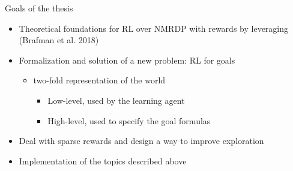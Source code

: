 \documentclass{beamer}
\begin{document}
\begin{frame}{Goals of the thesis}

\begin{itemize}
\item Theoretical foundations for RL over NMRDP with \LLf rewards by leveraging (Brafman et al. 2018)

\vskip 0.5cm

\item Formalization and solution of a new problem: RL for \LLf goals 
\begin{itemize}
	\item two-fold representation of the world
	\begin{itemize}
		\item Low-level, used by the learning agent 
		\item High-level, used to specify the goal formulas 
	\end{itemize}


\end{itemize}

\vskip 0.5cm

\item Deal with sparse rewards and design a way to improve exploration

\vskip 0.5cm

\item Implementation of the topics described above

\end{itemize}

\end{frame}

\end{document}
